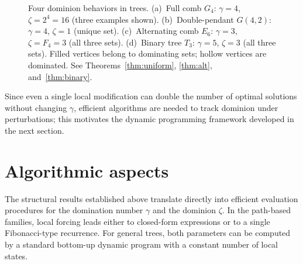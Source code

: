 \documentclass[11pt]{article}
\theoremstyle{definition}
\theoremstyle{remark}
\begin{document}
\begin{figure}[t]
\caption{Four dominion behaviors in trees. (a)~Full comb $G_4$: $\gamma=4$, 
$\zeta=2^4=16$ (three examples shown). (b)~Double-pendant $G(4,2)$: $\gamma=4$, $\zeta=1$ 
(unique set). (c)~Alternating comb $E_6$: $\gamma=3$, $\zeta=F_4=3$ (all three sets). 
(d)~Binary tree $T_3$: $\gamma=5$, $\zeta=3$ (all three sets). Filled vertices belong to 
dominating sets; hollow vertices are dominated. See Theorems~\ref{thm:uniform}, 
\ref{thm:alt}, and~\ref{thm:binary}.}
\label{fig:dominion-behaviors}
\end{figure}

Since even a single local modification can double the number of optimal solutions without changing
$\gamma$, efficient algorithms are needed to track dominion under perturbations; this motivates the
dynamic programming framework developed in the next section.

\section{Algorithmic aspects}

The structural results established above translate directly into efficient evaluation procedures for
the domination number $\gamma$ and the dominion $\zeta$.
In the path-based families, local forcing leads either to closed-form expressions or to a single
Fibonacci-type recurrence.
For general trees, both parameters can be computed by a standard bottom-up dynamic program with a constant number of local states.
\end{document}
